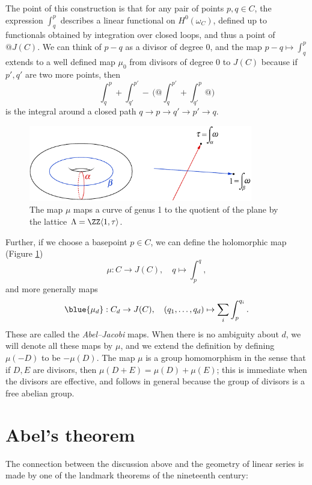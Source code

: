 The point of this construction is that for any pair of points $p, q
\in C$, the expression $\int_q^p$ describes a linear functional on
$H^0(\omega_C)$, defined up to functionals obtained by integration
over closed loops, and thus a point of $@J(C)$. We can think of $p-q$
as a divisor of 
degree 0, and the map $p-q \mapsto \int_q^p$ extends to a well defined map $\mu_0$ from divisors of degree 0 to $J(C)$ because if $p',q'$ are two more points, then
{\meshing
$$
\int_q^p +\int_{q'}^{p'} \! - \,\biggl(@\int_q^{p'} +\int_{q'}^p@\biggr) 
$$}%
is the integral around a closed path $q\to p\to q'\to p' \to q$.

\begin{figure}
\includegraphics[height=1.3in]{"main/Fig04-3"}
 \caption{The map $\mu$ maps a curve of genus 1 to the quotient of the plane by the lattice $\Lambda = \ZZ\langle 1,\tau\rangle$.}
\label{abeljacobi}
\end{figure}

Further, if we choose a basepoint  $p\in C$, we can define the holomorphic map (Figure \ref{abeljacobi})
%
$$
\mu  :  C  \to  J(C), \quad q\mapsto \int_{p}^{q},
$$
and more generally maps
$$
\blue{\mu_d}
:  C_d  \to  J(C), \quad (q_1,\dots, q_d) \mapsto \sum_i \int_{p}^{q_i}.
$$
These 
are called the \emph{Abel--Jacobi} maps. When there is no
%
ambiguity about $d$, we will denote all these maps  by $\mu$,  and   
we extend the definition by defining $\mu(-D)$ to be $-\mu(D)$.
The map $\mu$ is a group homomorphism in the sense that if $D, E$ are divisors, then
$\mu (D+E) = \mu(D) + \mu(E)$; this is immediate when the divisors are effective, and 
follows in general because the group of divisors is a free abelian group.

\section{Abel's theorem}

The connection between the discussion above and the geometry of linear
series is made by one of the landmark theorems of the nineteenth century: 

